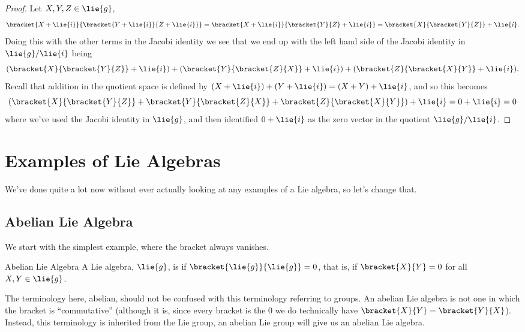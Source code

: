 \documentclass[fleqn]{NotesClass}
\begin{document}
\begin{lma}{}{}
\begin{proof}
            Let \(X, Y, Z \in \lie{g}\),
            \begin{equation}
                \bracket{X + \lie{i}}{\bracket{Y + \lie{i}}{Z + \lie{i}}} = \bracket{X + \lie{i}}{\bracket{Y}{Z} + \lie{i}} = \bracket{X}{\bracket{Y}{Z}} + \lie{i}.
            \end{equation}
            Doing this with the other terms in the Jacobi identity we see that we end up with the left hand side of the Jacobi identity in \(\lie{g}/\lie{i}\) being
            \begin{equation}
                (\bracket{X}{\bracket{Y}{Z}} + \lie{i}) + (\bracket{Y}{\bracket{Z}{X}} + \lie{i}) + (\bracket{Z}{\bracket{X}{Y}} + \lie{i}).
            \end{equation}
            Recall that addition in the quotient space is defined by \((X + \lie{i}) + (Y + \lie{i}) = (X + Y) + \lie{i}\), and so this becomes
            \begin{equation}
                (\bracket{X}{\bracket{Y}{Z}} + \bracket{Y}{\bracket{Z}{X}} + \bracket{Z}{\bracket{X}{Y}}) + \lie{i} = 0 + \lie{i} = 0
            \end{equation}
            where we've used the Jacobi identity in \(\lie{g}\), and then identified \(0 + \lie{i}\) as the zero vector in the quotient \(\lie{g}/\lie{i}\).
        \end{proof}
    \end{lma}
    
    \section{Examples of Lie Algebras}
    We've done quite a lot now without ever actually looking at any examples of a Lie algebra, so let's change that.
    
    \subsection{Abelian Lie Algebra}
    We start with the simplest example, where the bracket always vanishes.
    
    \begin{dfn}{Abelian Lie Algebra}{}
        A Lie algebra, \(\lie{g}\), is  if \(\bracket{\lie{g}}{\lie{g}} = 0\), that is, if \(\bracket{X}{Y} = 0\) for all \(X, Y \in \lie{g}\).
    \end{dfn}
    
    The terminology here, abelian, should not be confused with this terminology referring to groups.
    An abelian Lie algebra is not one in which the bracket is \enquote{commutative} (although it is, since every bracket is the 0 we do technically have \(\bracket{X}{Y} = \bracket{Y}{X}\)).
    Instead, this terminology is inherited from the Lie group, an abelian Lie group will give us an abelian Lie algebra.
    
\end{document}
